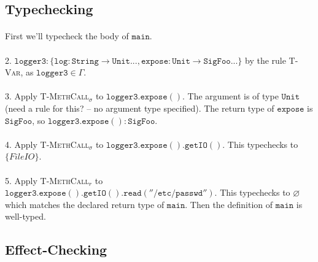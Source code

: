 \documentclass{llncs}
\newcommand{\keywadj}[1]{\mathtt{#1}}
\begin{document}
\subsection*{Typechecking}

\paragraph{}
First we'll typecheck the body of $\keywadj{main}$. 

\paragraph{}
2. $\keywadj{logger3 : \{ log : String \rightarrow Unit ..., expose : Unit \rightarrow SigFoo ... \}}$ by the rule \textsc{T-Var}, as $\keywadj{logger3} \in \Gamma$.

\paragraph{}
3. Apply \textsc{T-MethCall$_\sigma$} to $\keywadj{logger3.expose()}$. The argument is of type $\keywadj{Unit}$ (need a rule for this? -- no argument type specified). The return type of $\keywadj{expose}$ is $\keywadj{SigFoo}$, so $\keywadj{logger3.expose() : SigFoo}$.

\paragraph{}
4. Apply \textsc{T-MethCall$_\sigma$} to $\keywadj{logger3.expose().getIO()}$. This typechecks  to $\{ FileIO \}$.

\paragraph{}
5. Apply \textsc{T-MethCall$_r$} to $\keywadj{logger3.expose().getIO().read(''/etc/passwd'')}$. This typechecks to $\varnothing$ which matches the declared return type of $\keywadj{main}$. Then the definition of $\keywadj{main}$ is well-typed.

\subsection*{Effect-Checking}
\end{document}
